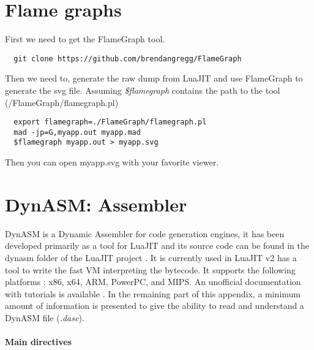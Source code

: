 
\chapter{Flame graphs}
\label{Apendix:fl}

First we need to get the FlameGraph \cite{flamegraph} tool.
\begin{center}
\begin{lstlisting}
  git clone https://github.com/brendangregg/FlameGraph
\end{lstlisting}
\end{center}
Then we need to, generate the raw dump from LuaJIT and use FlameGraph to generate
the svg file. Assuming \emph{\$flamegraph} contains the path to the tool (/FlameGraph/flamegraph.pl)

\begin{center}
\begin{lstlisting}
  export flamegraph=./FlameGraph/flamegraph.pl
  mad -jp=G,myapp.out myapp.mad
  $flamegraph myapp.out > myapp.svg
\end{lstlisting}
\end{center}
Then you can open myapp.svg with your favorite viewer.


\chapter{DynASM: Assembler}
\label{Apendix:DynASM}

DynASM is a Dynamic Assembler for code generation engines, it has been developed
primarily as a tool for LuaJIT and its source code can be found in the dynasm
folder of the LuaJIT project \cite{luajit-src}. It is currently used in LuaJIT
v2 has a tool to write the fast VM interpreting the bytecode. It supports the
following platforms : x86, x64, ARM, PowerPC, and MIPS. An unofficial
documentation with tutorials is available \cite{dynasm}. In the remaining part
of this appendix, a minimum amount of information is presented to give the
ability to read and understand a DynASM file (\emph{.dasc}).


\subsubsection{Main directives}

